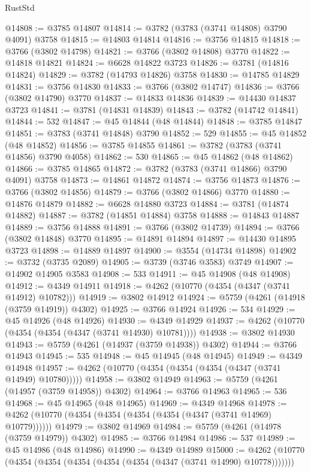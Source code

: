 \begin{lexlean}{RustStd}
\begin{coremodule}
@14808 := @3785 @14807
@14814 := @3782 (@3783 (@3741 @14808) @3790 @4091) @3758
@14815 := @14803 @14814
@14816 := @3756 @14815
@14818 := @3766 (@3802 @14798)
@14821 := @3766 (@3802 @14808) @3770
@14822 := @14818 @14821
@14824 := @6628 @14822 @3723
@14826 := @3781 (@14816 @14824)
@14829 := @3782 (@14793 @14826) @3758
@14830 := @14785 @14829
@14831 := @3756 @14830
@14833 := @3766 (@3802 @14747)
@14836 := @3766 (@3802 @14790) @3770
@14837 := @14833 @14836
@14839 := @14430 @14837 @3723
@14841 := @3781 (@14831 @14839)
@14843 := @3782 (@14742 @14841)
@14844 := 532
@14847 := @45 @14844 (@48 @14844)
@14848 := @3785 @14847
@14851 := @3783 (@3741 @14848) @3790
@14852 := 529
@14855 := @45 @14852 (@48 @14852)
@14856 := @3785 @14855
@14861 := @3782 (@3783 (@3741 @14856) @3790 @4058)
@14862 := 530
@14865 := @45 @14862 (@48 @14862)
@14866 := @3785 @14865
@14872 := @3782 (@3783 (@3741 @14866) @3790 @4091) @3758
@14873 := @14861 @14872
@14874 := @3756 @14873
@14876 := @3766 (@3802 @14856)
@14879 := @3766 (@3802 @14866) @3770
@14880 := @14876 @14879
@14882 := @6628 @14880 @3723
@14884 := @3781 (@14874 @14882)
@14887 := @3782 (@14851 @14884) @3758
@14888 := @14843 @14887
@14889 := @3756 @14888
@14891 := @3766 (@3802 @14739)
@14894 := @3766 (@3802 @14848) @3770
@14895 := @14891 @14894
@14897 := @14430 @14895 @3723
@14898 := @14889 @14897
@14900 := @3554 (@14734 @14898)
@14902 := @3732 (@3735 @2089)
@14905 := @3739 (@3746 @3583) @3749
@14907 := @14902 @14905 @3583
@14908 := 533
@14911 := @45 @14908 (@48 @14908)
@14912 := @4349 @14911
@14918 := @4262 (@10770 (@4354 (@4347 (@3741 @14912) @10782)))
@14919 := @3802 @14912
@14924 := @5759 (@4261 (@14918 (@3759 @14919)) @4302)
@14925 := @3766 @14924
@14926 := 534
@14929 := @45 @14926 (@48 @14926)
@14930 := @4349 @14929
@14937 := @4262 (@10770 (@4354 (@4354 (@4347 (@3741 @14930) @10781))))
@14938 := @3802 @14930
@14943 := @5759 (@4261 (@14937 (@3759 @14938)) @4302)
@14944 := @3766 @14943
@14945 := 535
@14948 := @45 @14945 (@48 @14945)
@14949 := @4349 @14948
@14957 := @4262 (@10770 (@4354 (@4354 (@4354 (@4347 (@3741 @14949) @10780)))))
@14958 := @3802 @14949
@14963 := @5759 (@4261 (@14957 (@3759 @14958)) @4302)
@14964 := @3766 @14963
@14965 := 536
@14968 := @45 @14965 (@48 @14965)
@14969 := @4349 @14968
@14978 := @4262 (@10770 (@4354 (@4354 (@4354 (@4354 (@4347 (@3741 @14969) @10779))))))
@14979 := @3802 @14969
@14984 := @5759 (@4261 (@14978 (@3759 @14979)) @4302)
@14985 := @3766 @14984
@14986 := 537
@14989 := @45 @14986 (@48 @14986)
@14990 := @4349 @14989
@15000 := @4262 (@10770 (@4354 (@4354 (@4354 (@4354 (@4354 (@4347 (@3741 @14990) @10778)))))))

\end{coremodule}
\end{lexlean}
